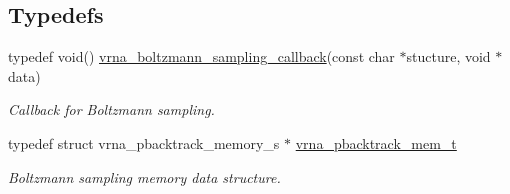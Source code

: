 \subsection*{Typedefs}
\begin{DoxyCompactItemize}
\item 
typedef void() \mbox{\hyperlink{group__subopt__stochbt_gad5bd9c8b195dd9cde15389f0042f0e44}{vrna\+\_\+boltzmann\+\_\+sampling\+\_\+callback}}(const char $\ast$stucture, void $\ast$data)
\begin{DoxyCompactList}\small\item\em Callback for Boltzmann sampling. \end{DoxyCompactList}\item 
typedef struct vrna\+\_\+pbacktrack\+\_\+memory\+\_\+s $\ast$ \mbox{\hyperlink{group__subopt__stochbt_gaa59c30efbed96bf9aaf8005584c72e63}{vrna\+\_\+pbacktrack\+\_\+mem\+\_\+t}}
\begin{DoxyCompactList}\small\item\em Boltzmann sampling memory data structure. \end{DoxyCompactList}\end{DoxyCompactItemize}
